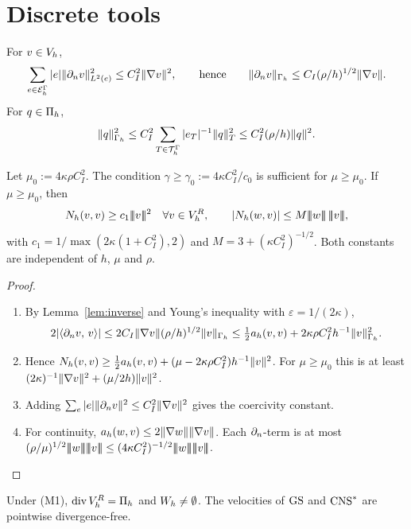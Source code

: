 \section{Discrete tools}\label{sec:discrete}

\begin{lemma}\label{lem:inverse}
For $v\in V_h$,
\[
\sum_{e\in\mathcal E_h^\Gamma}|e|\lVert \partial_n v\rVert^2_{L^2(e)}\le C_I^2\lVert \nabla v\rVert^2,
\qquad\text{hence}\qquad
\lVert \partial_n v\rVert_{\Gamma_h}\le C_I(\rho/h)^{1/2}\lVert \nabla v\rVert.
\]
For $q\in\Pi_h$,
\[
\lVert q\rVert^2_{\Gamma_h}\le C_I^2\sum_{T\in\mathcal T_h^\Gamma}|e_T|^{-1}\lVert q\rVert^2_T\le C_I^2(\rho/h)\lVert q\rVert^2 .
\]
\end{lemma}

\begin{lemma}\label{lem:coercive}
Let $\mu_0:=4\kappa\rho C_I^2$. The condition $\gamma\ge\gamma_0:=4\kappa C_I^2/c_0$ is sufficient for $\mu\ge\mu_0$. If $\mu\ge\mu_0$, then
\[
N_h(v,v)\ge c_1\tnorm{v}^2\quad\forall v\in\VR,\qquad
|N_h(w,v)|\le M\tnorm{w}\,\tnorm{v},
\]
with $c_1=1/\max(2\kappa(1+C_I^2),2)$ and $M=3+(\kappa C_I^2)^{-1/2}$. Both constants are independent of $h$, $\mu$ and $\rho$.
\end{lemma}

\begin{proof}
\begin{enumerate}
\item By Lemma~\ref{lem:inverse} and Young's inequality with $\varepsilon=1/(2\kappa)$,
\[
2|\langle \partial_n v,\, v\rangle|\le2C_I\lVert \nabla v\rVert(\rho/h)^{1/2}\lVert v\rVert_{\Gamma_h}\le\tfrac12a_h(v,v)+2\kappa\rho C_I^2h^{-1}\lVert v\rVert^2_{\Gamma_h}.
\]
\item Hence $N_h(v,v)\ge\frac12a_h(v,v)+(\mu-2\kappa\rho C_I^2)h^{-1}\lVert v\rVert^2$. For $\mu\ge\mu_0$ this is at least $(2\kappa)^{-1}\lVert \nabla v\rVert^2+(\mu/2h)\lVert v\rVert^2$.
\item Adding $\sum_e|e|\lVert \partial_n v\rVert^2\le C_I^2\lVert \nabla v\rVert^2$ gives the coercivity constant.
\item For continuity, $a_h(w,v)\le2\lVert \nabla w\rVert\lVert \nabla v\rVert$. Each $\partial_n$-term is at most $(\rho/\mu)^{1/2}\tnorm w\tnorm v\le(4\kappa C_I^2)^{-1/2}\tnorm w\tnorm v$.\qedhere
\end{enumerate}
\end{proof}

\begin{lemma}\label{lem:divrange}
Under (M1), $\operatorname{div}V_h^R=\Pi_h$ and $W_h\neq\emptyset$. The velocities of $\mathrm{GS}$ and $\mathrm{CNS}^\ast$ are pointwise divergence-free.
\end{lemma}

